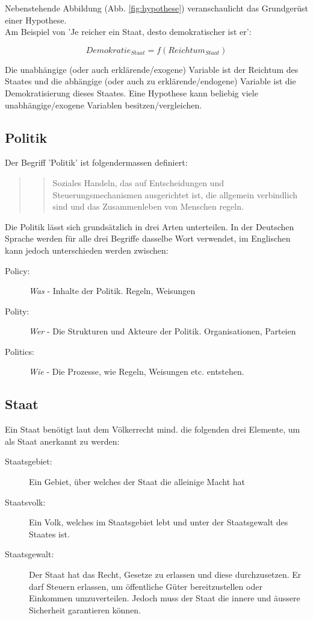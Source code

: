 \documentclass[a4paper, 11pt]{article}
\begin{document}
Nebenstehende Abbildung (Abb. \ref{fig:hypothese}) veranschaulicht das Grundgerüst einer Hypothese. \\
Am Beispiel von 'Je reicher ein Staat, desto demokratischer ist er':

\begin{equation}
Demokratie_{Staat} = f(Reichtum_{Staat})
\end{equation}

Die unabhängige (oder auch erklärende/exogene) Variable ist der Reichtum des Staates und die abhängige (oder auch zu erklärende/endogene) Variable ist die Demokratisierung dieses Staates. Eine Hypothese kann beliebig viele unabhängige/exogene Variablen besitzen/vergleichen.



\subsection{Politik}
Der Begriff 'Politik' ist folgendermassen definiert:

\begin{quote}
    \blockquote{Soziales Handeln, das auf Entscheidungen und Steuerungsmechanismen ausgerichtet ist, die allgemein verbindlich sind und das Zusammenleben von Menschen regeln.}
\end{quote}

Die Politik lässt sich grundsätzlich in drei Arten unterteilen. In der Deutschen Sprache werden für alle drei Begriffe dasselbe Wort verwendet, im Englischen kann jedoch unterschieden werden zwischen: 
\begin{description}
    \item[Policy: ] \textit{Was} - Inhalte der Politik. Regeln, Weisungen
    \item[Polity:] \textit{Wer} - Die Strukturen und Akteure der Politik.  Organisationen, Parteien 
    \item[Politics:]  \textit{Wie} - Die Prozesse, wie Regeln, Weisungen etc. entstehen.
\end{description}

\subsection{Staat}
Ein Staat benötigt laut dem Völkerrecht mind. die folgenden drei Elemente, um als Staat anerkannt zu werden: 
\begin{description}
    \item[Staatsgebiet: ] Ein Gebiet, über welches der Staat die alleinige Macht hat
    \item[Staatsvolk: ] Ein Volk, welches im Staatsgebiet lebt und unter der Staatsgewalt des Staates ist.
    \item[Staatsgewalt: ] Der Staat hat das Recht, Gesetze zu erlassen und diese durchzusetzen. Er darf Steuern erlassen, um öffentliche Güter bereitzustellen oder Einkommen umzuverteilen. Jedoch muss der Staat die innere und äussere Sicherheit garantieren können.
\end{description}
\end{document}
